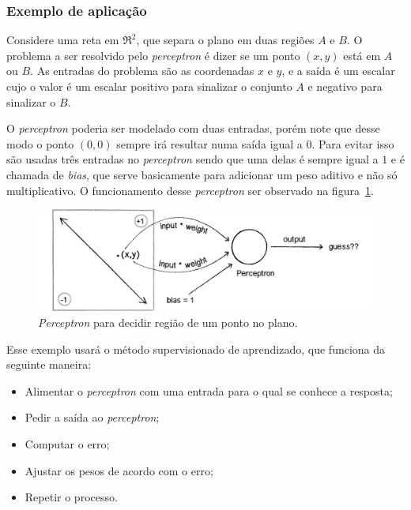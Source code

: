 \subsubsection{Exemplo de aplicação}

Considere uma reta em $\Re^2$, que separa o plano em duas regiões $A$ e $B$. O problema a
ser resolvido pelo \textit{perceptron} é dizer se um ponto $(x,y)$ está em $A$ ou $B$. As entradas do
problema são as coordenadas $x$ e $y$, e a saída é um escalar cujo o valor é um escalar positivo
para sinalizar o conjunto $A$ e negativo para sinalizar o $B$.

O \textit{perceptron} poderia ser modelado com duas entradas, porém note que desse modo o
ponto $(0,0)$ sempre irá resultar numa saída igual a $0$. Para evitar isso são usadas três entradas
no \textit{perceptron} sendo que uma delas é sempre igual a $1$ e é chamada de \emph{bias}, que serve
basicamente para adicionar um peso aditivo e não só multiplicativo. O funcionamento desse \textit{perceptron}
ser observado na figura~\ref{fig:rede_neural_simple_problem}.

\begin{figure}[H]
\centering
\includegraphics[width=15cm]{figuras/rede_neural_simple_problem}
\caption{\textit{Perceptron} para decidir região de um ponto no plano.}\label{fig:rede_neural_simple_problem}
\end{figure}

Esse exemplo usará o método supervisionado de aprendizado, que funciona da seguinte maneira:

\begin{itemize}
\item
  Alimentar o \textit{perceptron} com uma entrada para o qual se conhece a resposta;
\item
  Pedir a saída ao \textit{perceptron};
\item
  Computar o erro;
\item
  Ajustar os pesos de acordo com o erro;
\item
  Repetir o processo.
\end{itemize}

